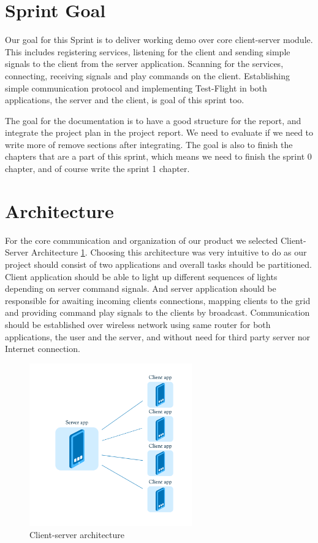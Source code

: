 
\section{Sprint Goal}

Our goal for this Sprint is to deliver working demo over core client-server module.
This includes registering services, listening for the client and sending simple signals to the client from the server application.
Scanning for the services, connecting, receiving signals and play commands on the client.
Establishing simple communication protocol and implementing Test-Flight in both applications, the server and the client, is goal of this sprint too.

The goal for the documentation is to have a good structure for the report, and integrate the project plan in the project report. We need to evaluate if we need to write more of remove sections after integrating. The goal is also to finish the chapters that are a part of this sprint, which means we need to finish the sprint 0 chapter, and of course write the sprint 1 chapter.

\section{Architecture}
For the core communication and organization of our product we selected Client-Server Architecture \ref{fig:sprint1_arhitecture}.
Choosing this architecture was very intuitive to do as our project should consist of two applications and overall tasks should be partitioned. 
Client application should be able to light up different sequences of lights depending on server command signals.
And server application should be responsible for awaiting incoming clients connections, mapping clients to the grid and providing command play signals to the clients by broadcast.
Communication should be established over wireless network using same router for both applications, the user and the server, and without need for third party server nor Internet connection. 

\begin{figure}[H]
	\centering
		\includegraphics[width=7cm]{sprint1/arhitecture.png}
	\caption{Client-server architecture}
	\label{fig:sprint1_arhitecture}
\end{figure}

